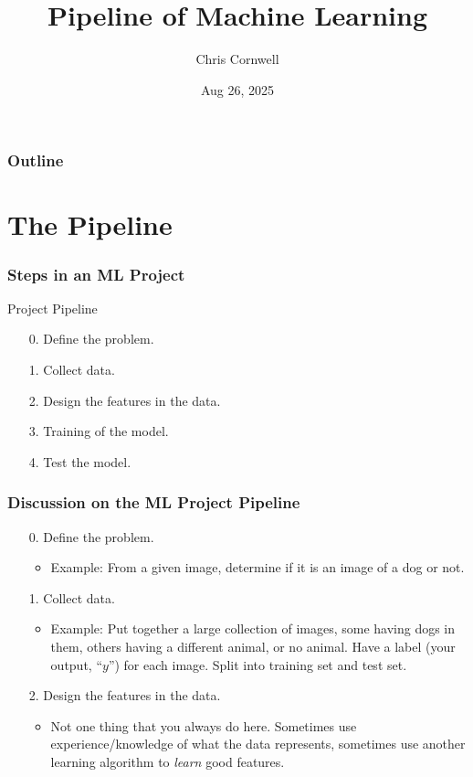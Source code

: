 \documentclass{beamer}
\author{Chris Cornwell}
\date{Aug 26, 2025}
\title{Pipeline of Machine Learning}
\newenvironment{codeblock}
    {\hfill\begin{beamerboxesrounded}[lower=codecol, width=0.8\textwidth]
    \medskip

    }
    { 
    \end{beamerboxesrounded}\hfill
    }
\theoremstyle{example}
\newcommand{\gnum}[1]{{\color{mygreen}#1.}}
\begin{document}
\begin{frame}
\titlepage
\end{frame}

\begin{frame}
\frametitle{Outline}
\tableofcontents
\end{frame}

\section{The Pipeline}

\begin{frame}
\frametitle{Steps in an ML Project}

\begin{codeblock}

{\color{mygreen}Project Pipeline
    \begin{enumerate}
        \item[\gnum{0}] Define the problem.
        \item[\gnum{1}] Collect data.
        \item[\gnum{2}] Design the features in the data.
        \item[\gnum{3}] Training of the model.
        \item[\gnum{4}] Test the model.
    \end{enumerate}
}

\end{codeblock}

\end{frame}

\begin{frame}
\frametitle{Discussion on the ML Project Pipeline}
    \begin{enumerate}
        \item[\gnum{0}] Define the problem.
        \begin{itemize}
            \item Example: From a given image, determine if it is an image of a dog or not.
        \end{itemize}
        \item[\gnum{1}] Collect data.
        \begin{itemize}
            \item Example: Put together a large collection of images, some having dogs in them, others having a different animal, or no animal. Have a label (your output, ``$y$'') for each image. Split into training set and test set.
        \end{itemize}
        \item[\gnum{2}] Design the features in the data.
        \begin{itemize}
            \item Not one thing that you always do here. Sometimes use experience/knowledge of what the data represents, sometimes use another learning algorithm to \emph{learn} good features.
        \end{itemize}
    \end{enumerate}
\end{frame}
\end{document}
